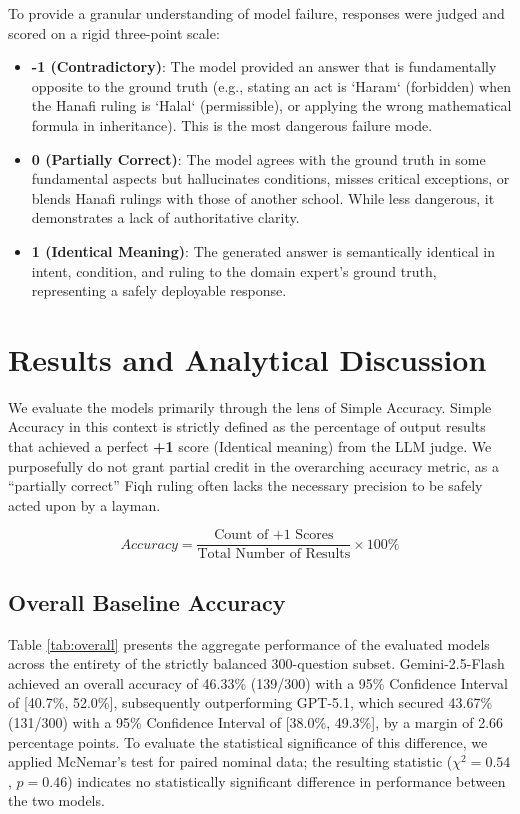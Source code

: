 To provide a granular understanding of model failure, responses were judged and scored on a rigid three-point scale:
\begin{itemize}
    \item \textbf{-1 (Contradictory)}: The model provided an answer that is fundamentally opposite to the ground truth (e.g., stating an act is `Haram` (forbidden) when the Hanafi ruling is `Halal` (permissible), or applying the wrong mathematical formula in inheritance). This is the most dangerous failure mode.
    \item \textbf{0 (Partially Correct)}: The model agrees with the ground truth in some fundamental aspects but hallucinates conditions, misses critical exceptions, or blends Hanafi rulings with those of another school. While less dangerous, it demonstrates a lack of authoritative clarity.
    \item \textbf{1 (Identical Meaning)}: The generated answer is semantically identical in intent, condition, and ruling to the domain expert's ground truth, representing a safely deployable response.
\end{itemize}

\section{Results and Analytical Discussion}

We evaluate the models primarily through the lens of Simple Accuracy. Simple Accuracy in this context is strictly defined as the percentage of output results that achieved a perfect \textbf{+1} score (Identical meaning) from the LLM judge. We purposefully do not grant partial credit in the overarching accuracy metric, as a ``partially correct'' Fiqh ruling often lacks the necessary precision to be safely acted upon by a layman.

\begin{equation}
Accuracy=\frac{\text{Count of +1 Scores}}{\text{Total Number of Results}} \times 100\%
\end{equation}

\subsection{Overall Baseline Accuracy}
Table \ref{tab:overall} presents the aggregate performance of the evaluated models across the entirety of the strictly balanced 300-question subset. Gemini-2.5-Flash achieved an overall accuracy of 46.33\% (139/300) with a 95\% Confidence Interval of [40.7\%, 52.0\%], subsequently outperforming GPT-5.1, which secured 43.67\% (131/300) with a 95\% Confidence Interval of [38.0\%, 49.3\%], by a margin of 2.66 percentage points. To evaluate the statistical significance of this difference, we applied McNemar's test for paired nominal data; the resulting statistic ($\chi^2 = 0.54$, $p = 0.46$) indicates no statistically significant difference in performance between the two models.

